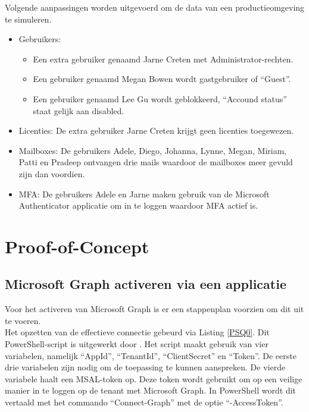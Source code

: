 Volgende aanpassingen worden uitgevoerd om de data van een productieomgeving te simuleren.

\begin{itemize}
    \item Gebruikers: 
    \begin{itemize}
        \item Een extra gebruiker genaamd Jarne Creten met Administrator-rechten.
        \item Een gebruiker genaamd Megan Bowen wordt gastgebruiker of “Guest”.
        \item Een gebruiker genaamd Lee Gu wordt geblokkeerd, “Accound status” staat gelijk aan disabled.
    \end{itemize}
    \item Licenties: De extra gebruiker Jarne Creten krijgt geen licenties toegewezen.
    \item Mailboxes: De gebruikers Adele, Diego, Johanna, Lynne, Megan, Miriam, Patti en Pradeep ontvangen drie mails waardoor de mailboxes meer gevuld zijn dan voordien.
    \item \ac{MFA}: De gebruikers Adele en Jarne maken gebruik van de Microsoft Authenticator applicatie om in te loggen waardoor \ac{MFA} actief is.
\end{itemize}

\section{Proof-of-Concept}

\subsection{Microsoft Graph activeren via een applicatie}

Voor het activeren van Microsoft Graph is er een stappenplan voorzien om dit uit te voeren. \\ %

Het opzetten van de effectieve connectie gebeurd via Listing \ref{PSQ0}. Dit PowerShell-script is uitgewerkt door \textcite{Terlisten2022}. Het script maakt gebruik van vier variabelen, namelijk “AppId”, “TenantId”, “ClientSecret” en “Token”. De eerste drie variabelen zijn nodig om de toepassing te kunnen aanspreken. De vierde variabele haalt een \ac{MSAL}-token op. Deze token wordt gebruikt om op een veilige manier in te loggen op de tenant met Microsoft Graph. In PowerShell wordt dit vertaald met het commando “Connect-Graph” met de optie “-AccessToken”. 

